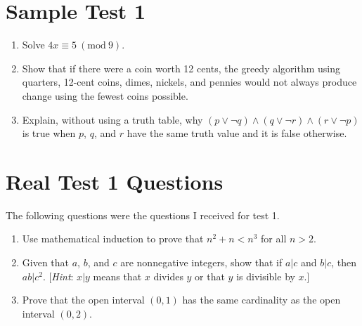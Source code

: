 \documentclass[11pt]{article}
\newcommand{\PMod}[1]{\ (\mathrm{mod}\ #1)}
\begin{document}
\section{Sample Test 1}

\begin{enumerate}
    \item Solve $4x \equiv 5 \PMod{9}$.
    \item Show that if there were a coin worth 12 cents, the greedy algorithm using quarters, 12-cent coins, dimes, nickels, and pennies would not always produce change using the fewest coins possible.
    \item Explain, without using a truth table, why $(p \lor \neg q) \land (q \lor \neg r) \land (r \lor \neg p)$ is true when $p$, $q$, and $r$ have the same truth value and it is false otherwise.
\end{enumerate}

\section{Real Test 1 Questions}
The following questions were the questions I received for test 1.

\begin{enumerate}
    \item Use mathematical induction to prove that $n^2 + n < n^3$ for all $n > 2$.
    \item Given that $a$, $b$, and $c$ are nonnegative integers, show that if $a|c$ and $b|c$, then $ab|c^2$. [\textit{Hint}: $x|y$ means that $x$ divides $y$ or that $y$ is divisible by $x$.]
    \item Prove that the open interval $(0, 1)$ has the same cardinality as the open interval $(0, 2)$.
\end{enumerate}
\end{document}
